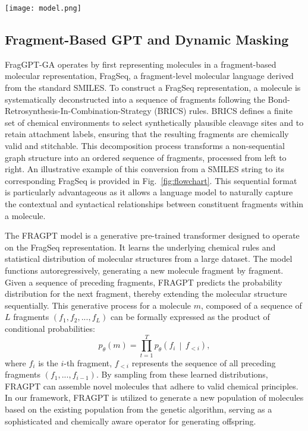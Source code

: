 \documentclass[lettersize,journal]{IEEEtran}
\begin{document}
\begin{figure*}[!t]
\centering
\texttt{[image: model.png]}
\caption{The iterative workflow of the proposed FragGPT-GA framework. The process synergizes a Genetic Algorithm (GA) for optimization with a Generative Pre-trained Transformer (GPT) for diversity expansion, featuring dynamic fragment masking and multi-objective selection.}
\label{fig:flowchart}
\end{figure*}

\subsection{Fragment-Based GPT and Dynamic Masking}

FragGPT-GA operates by first representing molecules in a fragment-based molecular representation, FragSeq, a fragment-level molecular language derived from the standard SMILES. To construct a FragSeq representation, a molecule is systematically deconstructed into a sequence of fragments following the Bond-Retrosynthesis-In-Combination-Strategy (BRICS) rules. BRICS defines a finite set of chemical environments to select synthetically plausible cleavage sites and to retain attachment labels, ensuring that the resulting fragments are chemically valid and stitchable. This decomposition process transforms a non-sequential graph structure into an ordered sequence of fragments, processed from left to right. An illustrative example of this conversion from a SMILES string to its corresponding FragSeq is provided in Fig.~\ref{fig:flowchart}. This sequential format is particularly advantageous as it allows a language model to naturally capture the contextual and syntactical relationships between constituent fragments within a molecule.

The FRAGPT model is a generative pre-trained transformer designed to operate on the FragSeq representation. It learns the underlying chemical rules and statistical distribution of molecular structures from a large dataset. The model functions autoregressively, generating a new molecule fragment by fragment. Given a sequence of preceding fragments, FRAGPT predicts the probability distribution for the next fragment, thereby extending the molecular structure sequentially. This generative process for a molecule $m$, composed of a sequence of $L$ fragments $(f_1, f_2, ..., f_L)$ can be formally expressed as the product of conditional probabilities:
\begin{equation}
p_{\theta}(m)=\prod_{t=1}^{T} p_{\theta}\!\left(f_i \,\middle|\, f_{<i}\right),
\end{equation}
where $f_i$ is the $i$-th fragment, $f_{<i}$ represents the sequence of all preceding fragments $(f_1,...,f_{i-1})$. By sampling from these learned distributions, FRAGPT can assemble novel molecules that adhere to valid chemical principles. In our framework, FRAGPT is utilized to generate a new population of molecules based on the existing population from the genetic algorithm, serving as a sophisticated and chemically aware operator for generating offspring.
\end{document}
